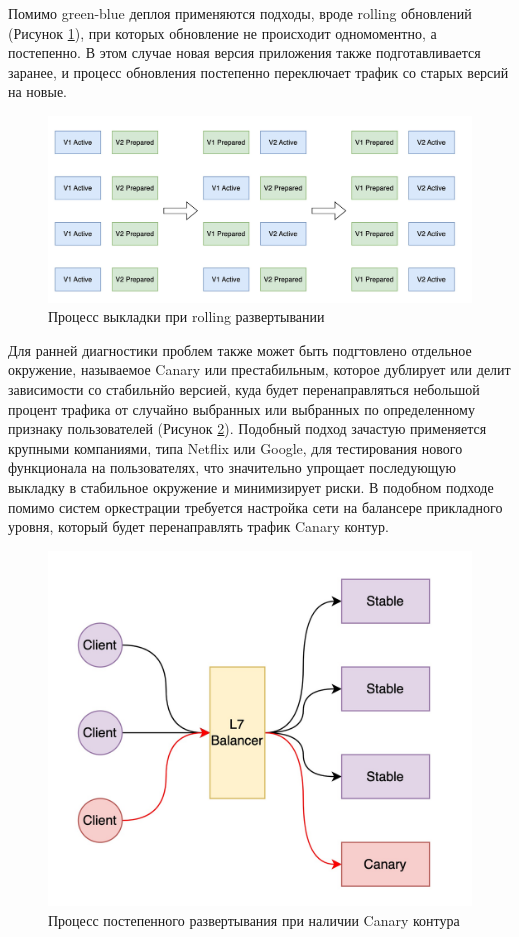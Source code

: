 Помимо green-blue деплоя применяются подходы, вроде rolling обновлений (Рисунок \ref{fig:rolling}), при которых обновление не происходит
одномоментно, а постепенно. В этом случае новая версия приложения также подготавливается заранее, и процесс обновления
постепенно переключает трафик со старых версий на новые.

\begin{figure}[H]
    \centering
    \includegraphics[width=0.8\linewidth]{img/rolling.jpg}
    \caption{Процесс выкладки при rolling развертывании}
    \label{fig:rolling}
\end{figure}

Для ранней диагностики проблем также может быть подгтовлено отдельное окружение, называемое Canary или престабильным, которое дублирует или делит 
зависимости со стабильнйо версией, куда будет перенаправляться небольшой процент трафика от случайно выбранных или выбранных
по определенному признаку пользователей (Рисунок \ref{fig:canary}). Подобный подход зачастую применяется крупными компаниями, типа Netflix или Google, для
тестирования нового функционала на пользователях, что значительно упрощает последующую выкладку в стабильное окружение
и минимизирует риски. В подобном подходе помимо систем оркестрации требуется настройка 
сети на балансере прикладного уровня, который будет перенаправлять трафик Canary контур. 

\begin{figure}[H]
    \centering
    \includegraphics[width=0.8\linewidth]{img/canary.jpg}
    \caption{Процесс постепенного развертывания при наличии Canary контура}
    \label{fig:canary}
\end{figure}

